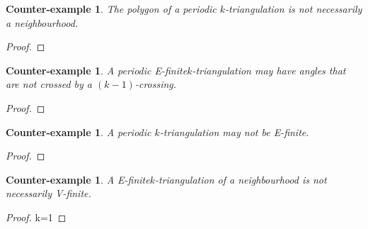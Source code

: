 \documentclass{amsart}
\newtheorem{ce}[theorem]{Counter-example}
\theoremstyle{remark}
\newcommand*{\nbd}[0]{neighbourhood\xspace}
\newcommand*{\ef}[0]{E-finite\xspace}
\newcommand*{\vf}[0]{V-finite\xspace}
\newcommand*{\ktg}[0]{$k$-triangulation\xspace}
\begin{document}
\begin{ce}
The polygon of a periodic \ktg is not necessarily a \nbd.
\end{ce}
\begin{proof}

\end{proof}

\begin{ce}
A periodic \ef \ktg may have angles that are not crossed by a $(k-1)$-crossing.
\end{ce}
\begin{proof}

\end{proof}

\begin{ce} 
A periodic \ktg may not be \ef.
\end{ce}
\begin{proof}

\end{proof}

\begin{ce}
A \ef \ktg of a \nbd is not necessarily \vf.
\end{ce}
\begin{proof}
k=1
\end{proof}





\end{document}
